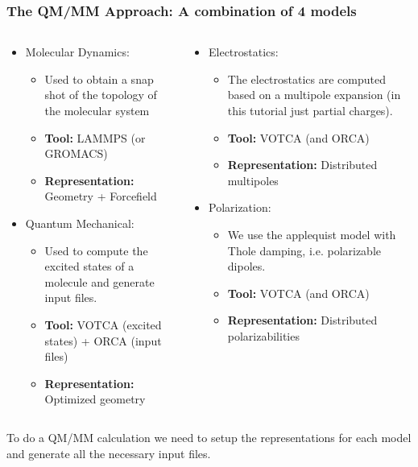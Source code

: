 \documentclass[t,aspectratio=169, 8pt]{beamer}
\begin{document}
\begin{frame}
  \frametitle{The QM/MM Approach: A combination of 4 models}
  \begin{columns}[t]
    \begin{column}{0.44\textwidth}
      \begin{itemize}
        \item Molecular Dynamics:
              \begin{itemize}
                \item Used to obtain a snap shot of the topology of the molecular system
                \item \textbf{Tool:} LAMMPS (or GROMACS)
                \item \textbf{Representation:} Geometry + Forcefield
              \end{itemize}
        \item Quantum Mechanical:
              \begin{itemize}
                \item Used to compute the excited states of a molecule and generate input files.
                \item \textbf{Tool:} VOTCA (excited states) + ORCA (input files)
                \item \textbf{Representation:} Optimized geometry
              \end{itemize}
      \end{itemize}
    \end{column}
    \begin{column}{0.44\textwidth}
      \begin{itemize}
        \item Electrostatics:
              \begin{itemize}
                \item The electrostatics are computed based on a multipole expansion (in this tutorial just partial charges).
                \item \textbf{Tool:} VOTCA (and ORCA)
                \item \textbf{Representation:} Distributed multipoles
              \end{itemize}
        \item Polarization:
              \begin{itemize}
                \item We use the applequist model with Thole damping, i.e. polarizable dipoles.
                \item \textbf{Tool:} VOTCA (and ORCA)
                \item \textbf{Representation:} Distributed polarizabilities
              \end{itemize}
      \end{itemize}
    \end{column}
  \end{columns}
  \vspace{0.5cm}
  To do a QM/MM calculation we need to setup the representations for each model and generate all the necessary input files.
\end{frame}
\end{document}
